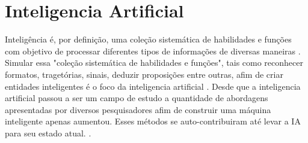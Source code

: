 \section{Inteligencia Artificial}

Inteligência é, por definição, uma coleção sistemática de habilidades e funções com objetivo de processar diferentes tipos de informações de diversas maneiras \cite[49]{guilford1982cognitive}. Simular essa "coleção sistemática de habilidades e funções", tais como reconhecer formatos, tragetórias, sinais, deduzir proposições entre outras, afim de criar entidades inteligentes é o foco da inteligencia artificial \cite[1]{russell2003artificial}. Desde que a inteligencia artificial passou a ser um campo de estudo a quantidade de abordagens apresentadas por diversos pesquisadores afim de construir uma máquina inteligente apenas aumentou. Esses métodos se auto-contribuiram até levar a IA para seu estado atual. \cite[2]{russell2003artificial}.